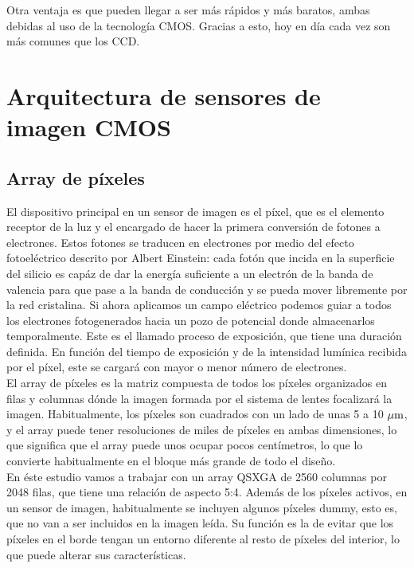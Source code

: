 Otra ventaja es que pueden llegar a ser más rápidos y más baratos, ambas debidas
al uso de la tecnología CMOS. Gracias a esto, hoy en día cada vez son más comunes que los
CCD.\\


\section{Arquitectura de sensores de imagen CMOS}

\subsection{Array de píxeles}\label{cap:pxa_array}

El dispositivo principal en un sensor de imagen es el píxel, que es el elemento
receptor de la luz y el encargado de hacer la primera conversión de fotones a
electrones. Estos fotones se traducen en electrones por medio del efecto fotoeléctrico
descrito por Albert Einstein: cada fotón que incida en la superficie del silicio
es capáz de dar la energía suficiente a un electrón de la banda de valencia para que
pase a la banda de conducción y se pueda mover libremente por la red cristalina.
Si ahora aplicamos un campo eléctrico podemos guiar a todos los electrones
fotogenerados hacia un pozo de potencial donde almacenarlos temporalmente. Este
es el llamado proceso de exposición, que tiene una duración definida. En función
del tiempo de exposición y de la intensidad lumínica recibida por el píxel, este
se cargará con mayor o menor número de electrones.\\

El array de píxeles es la matriz compuesta de todos los píxeles organizados en filas
y columnas dónde la imagen formada por el sistema de lentes focalizará la imagen.
Habitualmente, los píxeles son cuadrados con un lado de unas 5 a 10 $\mu\text{m}$, y el
array puede tener resoluciones de miles de píxeles en ambas dimensiones, lo que
significa que el array puede unos ocupar pocos centímetros, lo que lo convierte
habitualmente en el bloque más grande de todo el diseño.\\

En éste estudio vamos a trabajar con un array QSXGA de 2560 columnas por 2048 filas,
que tiene una relación de aspecto 5:4. Además de los píxeles activos, en un sensor
de imagen, habitualmente se incluyen algunos píxeles dummy, esto es, que no van
a ser incluidos en la imagen leída. Su función es la de evitar que los píxeles
en el borde tengan un entorno diferente al resto de píxeles del interior, lo que
puede alterar sus características.\\

